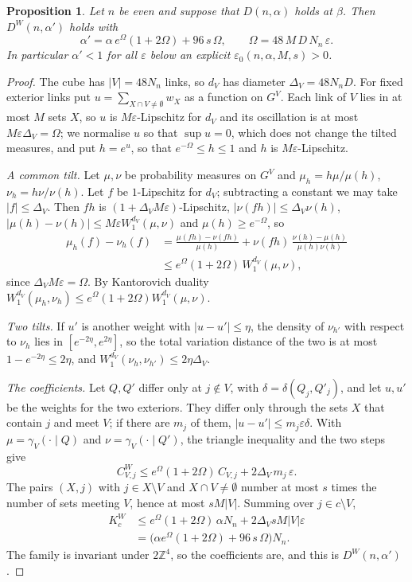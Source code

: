 \documentclass[aps,prd,twocolumn,superscriptaddress,nofootinbib,longbibliography,floatfix,amsmath,amssymb,10pt]{revtex4-2}
\newtheorem{proposition}[theorem]{Proposition}
\theoremstyle{definition}
\theoremstyle{remark}
\newcommand{\Z}{\mathbb{Z}}
\begin{document}
\begin{proposition}\label{prop:cubeopen}
Let $n$ be even and suppose that $D(n,\alpha)$ holds at $\beta$. Then
$D^W(n,\alpha')$ holds with
\[
\alpha'=\alpha\,e^{\Omega}(1+2\Omega)+96\,s\,\Omega,\qquad
\Omega=48\,M\,D\,N_n\,\varepsilon .
\]
In particular $\alpha'<1$ for all $\varepsilon$ below an explicit
$\varepsilon_0(n,\alpha,M,s)>0$.
\end{proposition}

\begin{proof}
The cube has $|V|=48N_n$ links, so $d_V$ has diameter $\Delta_V=48N_nD$.
For fixed exterior links put $u=\sum_{X\cap V\ne\emptyset}w_X$ as a function
on $G^V$. Each link of $V$ lies in at most $M$ sets $X$, so $u$ is
$M\varepsilon$-Lipschitz for $d_V$ and its oscillation is at most
$M\varepsilon\Delta_V=\Omega$; we normalise $u$ so that $\sup u=0$, which
does not change the tilted measures, and put $h=e^u$, so that
$e^{-\Omega}\le h\le1$ and $h$ is $M\varepsilon$-Lipschitz.

\emph{A common tilt.} Let $\mu,\nu$ be probability measures on $G^V$ and
$\mu_h=h\mu/\mu(h)$, $\nu_h=h\nu/\nu(h)$. Let $f$ be $1$-Lipschitz for $d_V$;
subtracting a constant we may take $|f|\le\Delta_V$. Then $fh$ is
$(1+\Delta_VM\varepsilon)$-Lipschitz, $|\nu(fh)|\le\Delta_V\nu(h)$,
$|\mu(h)-\nu(h)|\le M\varepsilon W_1^{d_V}(\mu,\nu)$ and $\mu(h)\ge
e^{-\Omega}$, so
\[
\begin{split}
\mu_h(f)-\nu_h(f)&=\frac{\mu(fh)-\nu(fh)}{\mu(h)}+\nu(fh)\,
\frac{\nu(h)-\mu(h)}{\mu(h)\nu(h)}\\
&\le e^{\Omega}(1+2\Omega)\,W_1^{d_V}(\mu,\nu),
\end{split}
\]
since $\Delta_VM\varepsilon=\Omega$. By Kantorovich duality
$W_1^{d_V}(\mu_h,\nu_h)\le e^{\Omega}(1+2\Omega)W_1^{d_V}(\mu,\nu)$.

\emph{Two tilts.} If $u'$ is another weight with $|u-u'|\le\eta$, the
density of $\nu_{h'}$ with respect to $\nu_h$ lies in $[e^{-2\eta},e^{2\eta}]$,
so the total variation distance of the two is at most $1-e^{-2\eta}\le
2\eta$, and $W_1^{d_V}(\nu_h,\nu_{h'})\le2\eta\Delta_V$.

\emph{The coefficients.} Let $Q,Q'$ differ only at $j\notin V$, with
$\delta=\delta(Q_j,Q'_j)$, and let $u,u'$ be the weights for the two
exteriors. They differ only through the sets $X$ that contain $j$ and meet
$V$; if there are $m_j$ of them, $|u-u'|\le m_j\varepsilon\delta$. With
$\mu=\gamma_V(\cdot\mid Q)$ and $\nu=\gamma_V(\cdot\mid Q')$, the triangle
inequality and the two steps give
\[
C^W_{V,j}\le e^{\Omega}(1+2\Omega)\,C_{V,j}+2\Delta_V\,m_j\,\varepsilon .
\]
The pairs $(X,j)$ with $j\in X\setminus V$ and $X\cap V\ne\emptyset$ number
at most $s$ times the number of sets meeting $V$, hence at most $sM|V|$. Summing
over $j\in c\setminus V$,
\[
\begin{split}
K^W_c&\le e^{\Omega}(1+2\Omega)\,\alpha N_n+2\Delta_VsM|V|\varepsilon\\
&=\bigl(\alpha e^{\Omega}(1+2\Omega)+96\,s\,\Omega\bigr)N_n .
\end{split}
\]
The family is invariant under $2\Z^4$, so the coefficients are, and this is
$D^W(n,\alpha')$.
\end{proof}
\end{document}
